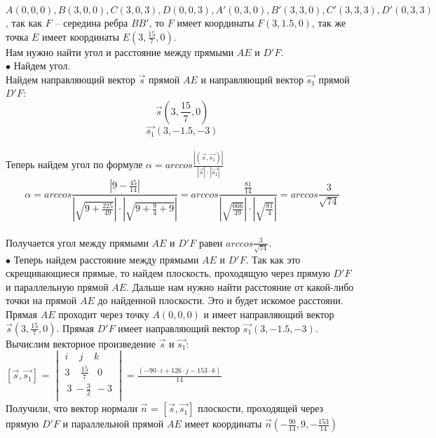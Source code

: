 \documentclass[12pt,a4paper]{scrartcl}
\begin{document}
	$A(0, 0, 0), B(3, 0, 0), C(3, 0, 3), D(0, 0, 3), A'(0, 3, 0), B'(3, 3, 0), C'(3, 3, 3), D'(0, 3, 3)$, так как $F$ -- середина ребра $BB'$, то $F$ имеет координаты $F(3, 1.5, 0)$, так же точка $E$ имеет координаты $E(3, \frac{15}{7}, 0)$.\\
	Нам нужно найти угол и расстояние между прямыми $AE$ и $D'F$.\\
	$\bullet$ Найдем угол.\\
	Найдем направляющий вектор $\overrightarrow{s}$ прямой $AE$ и направляющий вектор $\overrightarrow{s_1}$ прямой $D'F$:\\
	$$\overrightarrow{s}(3, \frac{15}{7}, 0)$$ 
	$$\overrightarrow{s_1}(3, -1.5, -3)$$\\
	Теперь найдем угол по формуле $\alpha = arccos\frac{|(\overrightarrow{s}, \overrightarrow{s_1})|}{|\overrightarrow{s}| \cdot |\overrightarrow{s_1}|}$\\
	$$\alpha = arccos\frac{|9 - \frac{45}{14}|}{|\sqrt{9 + \frac{225}{49}}| \cdot |\sqrt{9 + \frac{9}{4} + 9}|} = arccos\frac{\frac{81}{14}}{|\sqrt{\frac{666}{49}}|\cdot|\sqrt{\frac{81}{4}}|} = arccos\frac{3}{\sqrt{74}}$$\\
	Получается угол между прямыми $AE$ и $D'F$ равен $arccos\frac{3}{\sqrt{74}}$.\\
	$\bullet$ Теперь найдем расстояние между прямыми $AE$ и $D'F$. Так как это скрещивающиеся прямые, то найдем плоскость, проходящую через прямую $D'F$ и параллельную прямой $AE$. Дальше нам нужно найти расстояние от какой-либо точки на прямой $AE$ до найденной плоскости. Это и будет искомое расстояни.\\
	Прямая $AE$ проходит через точку $A(0, 0, 0)$ и имеет направляющий вектор $\overrightarrow{s}(3, \frac{15}{7}, 0)$. Прямая $D'F$ имеет направляющий вектор  $\overrightarrow{s_1}(3, -1.5, -3)$. Вычислим векторное произведение $\overrightarrow{s}$ и $\overrightarrow{s_1}$:\\
	$[\overrightarrow{s}, \overrightarrow{s_1}]$ = 
	$\begin{vmatrix}
		i~~~~~ j~~~~~ k\\
		3~~~~~\frac{15}{7}~~~~ 0\\
		~3~-\frac{3}{2}~~-3\\
		
	\end{vmatrix} = \frac{(-90\cdot i + 126 \cdot j-153 \cdot k)}{14}$ \\
	Получили, что вектор нормали $\overrightarrow{n}$ = $[\overrightarrow{s}, \overrightarrow{s_1}]$ плоскости, проходящей через прямую $D'F$ и параллельной прямой $AE$ имеет координаты $\overrightarrow{n}(-\frac{90}{14}, 9, -\frac{153}{14})$\\
\end{document}
